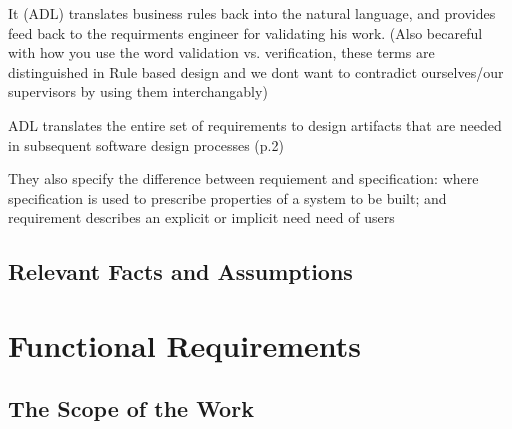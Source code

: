 \documentclass[12pt]{report}
\begin{document}
\begin{description}
{	It (ADL) translates business rules  back into the natural language, and provides feed back to 
	the requirments engineer for validating his work. (Also becareful with how you use the word 
	validation vs. verification, these terms are distinguished in Rule based design and we dont 
	want to contradict ourselves/our supervisors by using them interchangably)
	
	ADL translates the entire set of requirements to design artifacts that are needed in subsequent 
	software design processes (p.2)
	
	They also specify the difference between requiement and specification: where specification is 
	used to prescribe properties of a system to be built; and requirement describes an explicit or 
	implicit need need of users}
\end{description}


\section{Relevant Facts and Assumptions}\label{sec:Assumptions}

\chapter{Functional Requirements}\label{ch:Functional}
\section{The Scope of the Work}\label{sec:ScopeOfWork}
\end{document}
